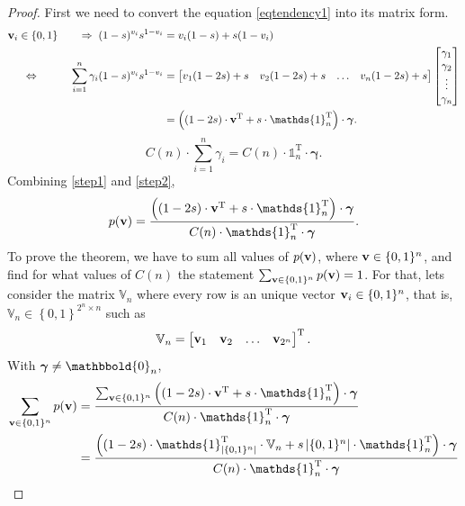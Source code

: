 \documentclass{article}
\newcommand{\0}{\mathbbold{0}}
\newcommand{\1}{\mathds{1}}
\newcommand{\2}{\mathbbold{2}}
\newcommand{\V}{\mathbb{V}}
\newcommand{\T}{^{\operatorname{T}}}
\newcommand{\LRA}{\Leftrightarrow\mkern40mu}
\begin{document}
\begin{proof}
    First we need to convert the equation \eqref{eqtendency1} into its matrix form.
    \begin{alignat}{2}
        {\bf v}_i \in \{0,1\} \mkern5mu&&\Rightarrow\mkern5mu (1-s)^{v_i}s^{1-v_i} &= v_i(1-s) + s(1-v_i) \notag \\
        \LRA && \sum_{i=1}^{n}\gamma_i(1-s)^{v_i}s^{1-v_i} &= \begin{bmatrix}
            v_1(1-2s) + s & v_2(1-2s) + s & \dots & v_n(1-2s) + s
        \end{bmatrix} \begin{bmatrix}
            \gamma_1 \\ \gamma_2 \\ \vdots \\ \gamma_n
        \end{bmatrix} \notag \\
        &&&= \left((1-2s)\cdot {\bf v}\T + s\cdot\1_n\T\right)\cdot {\boldsymbol \gamma}. \label{step1}
    \end{alignat}
    \begin{equation}
        C(n)\cdot\sum_{i=1}^{n}\gamma_i = C(n) \cdot \1_n\T \cdot {\boldsymbol \gamma}. \label{step2}
    \end{equation}
    Combining \eqref{step1} and \eqref{step2},
    \begin{equation}
        p({\bf v}) = \frac{\left((1-2s)\cdot {\bf v}\T + s\cdot\1_n\T\right)\cdot {\boldsymbol \gamma}}{C(n) \cdot \1_n\T \cdot {\boldsymbol \gamma}}.
    \end{equation}
    To prove the theorem, we have to sum all values of $p({\bf v})$, where ${\bf v} \in \{0,1\}^n$, and find for what values of $C(n)$ the statement $\sum_{{\bf v} \in \{0,1\}^n} p({\bf v}) = 1$. For that, lets consider the matrix $\V_n$ where every row is an unique vector ${\bf v}_i \in \{0,1\}^n$, that is, $\V_n \in \left\{0,1\right\}^{2^n \times n}$ such as
    $$ \V_n = \begin{bmatrix}
        {\bf v}_1 & {\bf v}_2 & \dots & {\bf v}_{2^n}
    \end{bmatrix}\T.  $$
    With ${\boldsymbol \gamma} \ne \0_n$,
    \begin{align*}
        \sum_{{\bf v} \in \{0,1\}^n} p({\bf v}) &= \frac{\sum_{{\bf v} \in \{0,1\}^n}\left((1-2s)\cdot {\bf v}\T + s\cdot\1_n\T\right)\cdot {\boldsymbol \gamma}}{C(n) \cdot \1_n\T \cdot {\boldsymbol \gamma}} \\
        &= \frac{\left((1-2s)\cdot\1\T_{\left\lvert \{0,1\}^n \right\rvert} \cdot \V_n + s\left\lvert \{0,1\}^n \right\rvert\cdot \1_n\T \right)\cdot {\boldsymbol \gamma}}{C(n) \cdot \1_n\T \cdot {\boldsymbol \gamma}} \\

\end{align*}
\end{proof}
\end{document}

